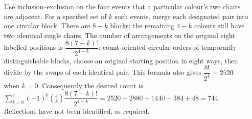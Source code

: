 Use inclusion--exclusion on the four events that a particular colour's two chairs are adjacent. For a specified set of $k$ such events, merge each designated pair into one circular block. There are $8-k$ blocks; the remaining $4-k$ colours still have two identical single chairs. The number of arrangements on the original eight labelled positions is $\dfrac{8(7-k)!}{2^{4-k}}$: count oriented circular orders of temporarily distinguishable blocks, choose an original starting position in eight ways, then divide by the swaps of each identical pair. This formula also gives $\dfrac{8!}{2^4}=2520$ when $k=0$. Consequently the desired count is $\sum_{k=0}^4(-1)^k\binom4k\dfrac{8(7-k)!}{2^{4-k}}=2520-2880+1440-384+48=\boxed{744}$. Reflections have not been identified, as required.
